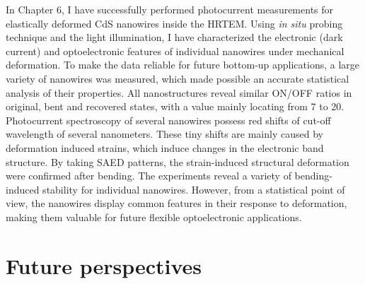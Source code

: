 In Chapter 6, I have successfully performed photocurrent measurements for elastically deformed CdS nanowires inside the HRTEM. Using {\it in situ}  probing technique and the light illumination, I have characterized the electronic (dark current) and optoelectronic features of individual nanowires under mechanical deformation. 
To make the data reliable for future bottom-up applications, a large variety of nanowires was measured, which made possible an accurate statistical analysis of their properties. 
All nanostructures reveal similar ON/OFF ratios in original, bent and recovered states, with a value mainly locating from 7 to 20. 
Photocurrent spectroscopy of several nanowires possess red shifts of cut-off wavelength of several nanometers. 
These tiny shifts are mainly caused by deformation induced strains, which induce changes in the electronic band structure. 
By taking SAED patterns, the strain-induced structural deformation were confirmed after bending. 
The experiments reveal a variety of bending-induced stability for individual nanowires. However, from a statistical point of view, the nanowires display common features in their response to deformation, making them valuable for future flexible optoelectronic applications. \\

\section{Future perspectives}



